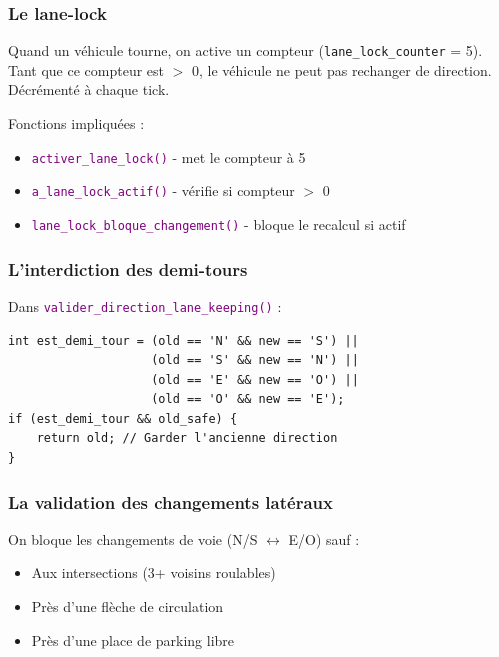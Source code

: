 \documentclass[11pt,a4paper]{article}
\newcommand{\fonction}[1]{\texttt{\textcolor{purple}{#1()}}}
\newcommand{\variable}[1]{\texttt{\textcolor{success}{#1}}}
\begin{document}
\subsubsection{Le lane-lock}

\begin{infobox}[Mécanisme]
Quand un véhicule tourne, on active un compteur (\variable{lane\_lock\_counter} = 5). Tant que ce compteur est $>$ 0, le véhicule ne peut pas rechanger de direction. Décrémenté à chaque tick.
\end{infobox}

Fonctions impliquées :
\begin{itemize}[noitemsep]
    \item \fonction{activer\_lane\_lock} - met le compteur à 5
    \item \fonction{a\_lane\_lock\_actif} - vérifie si compteur $>$ 0
    \item \fonction{lane\_lock\_bloque\_changement} - bloque le recalcul si actif
\end{itemize}

\subsubsection{L'interdiction des demi-tours}

Dans \fonction{valider\_direction\_lane\_keeping} :
\begin{lstlisting}
int est_demi_tour = (old == 'N' && new == 'S') ||
                    (old == 'S' && new == 'N') ||
                    (old == 'E' && new == 'O') ||
                    (old == 'O' && new == 'E');
if (est_demi_tour && old_safe) {
    return old; // Garder l'ancienne direction
}
\end{lstlisting}

\subsubsection{La validation des changements latéraux}

On bloque les changements de voie (N/S $\leftrightarrow$ E/O) sauf :
\begin{itemize}[noitemsep]
    \item Aux intersections (3+ voisins roulables)
    \item Près d'une flèche de circulation
    \item Près d'une place de parking libre
\end{itemize}

\end{document}
